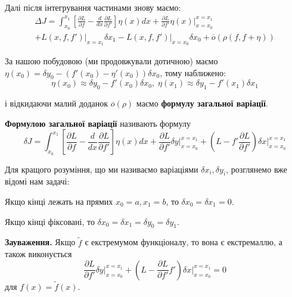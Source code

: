 \documentclass[14pt]{extarticle}
\newcommand{\<}{\langle}
\renewcommand{\>}{\rangle}
\theoremstyle{mystyle}{\newtheorem{definition}{Definition}[section]}
\theoremstyle{mystyle}{\newtheorem{proposition}[definition]{Proposition}}
\theoremstyle{mystyle}{\newtheorem{theorem}[definition]{Theorem}}
\theoremstyle{mystyle}{\newtheorem{lemma}[definition]{Lemma}}
\theoremstyle{mystyle}{\newtheorem{corollary}[definition]{Corollary}}
\theoremstyle{mystyle}{\newtheorem*{remark}{Remark}}
\theoremstyle{mystyle}{\newtheorem*{remarks}{Remarks}}
\theoremstyle{mystyle}{\newtheorem*{example}{Example}}
\theoremstyle{mystyle}{\newtheorem*{examples}{Examples}}
\theoremstyle{definition}{\newtheorem*{exercise}{Exercise}}
\theoremstyle{cstyle}{\newtheorem*{cthm}{}}
\theoremstyle{warn}
\begin{document}
Далі після інтегрування частинами знову маємо:
\begin{gather}
    \Delta J = \int_{x_0}^{x_1}\left[\frac{\partial L}{\partial f}-\frac{d}{dx}\frac{\partial L}{\partial f'}\right]\eta(x)dx + \frac{\partial L}{\partial f'}\eta(x)\Big|_{x=x_0}^{x=x_1} \nonumber \\
 + L(x,f,f')\Big|_{x=x_1}\delta x_1 - L(x,f,f')\Big|_{x=x_0}\delta x_0 + \overline{o}(\rho(f,f+\eta))
\end{gather}

За нашою побудовою (ми продовжували дотичною) маємо $\eta(x_0) = \delta y_0 - (f'(x_0)-\eta'(x_0))\delta x_0$, тому наближено:
\begin{equation}
    \eta(x_0) \approx \delta y_0 - f'(x_0)\delta x_0, \; \eta(x_1) \approx \delta y_1 - f'(x_1)\delta x_1
\end{equation}

і відкидаючи малий доданок $\overline{o}(\rho)$ маємо \textbf{формулу загальної варіації}.
\begin{definition}
\textbf{Формулою загальної варіації} називають формулу
\begin{equation}
    \delta J = \int_{x_0}^{x_1}\left[\frac{\partial L}{\partial f}-\frac{d}{dx}\frac{\partial L}{\partial f'}\right]\eta(x)dx + \frac{\partial L}{\partial f'}\delta y\Big|_{x=x_0}^{x=x_1} +
    \left(L-f'\frac{\partial L}{\partial f'}\right)\delta x \Big|_{x=x_0}^{x=x_1}
\end{equation}
\end{definition}

Для кращого розуміння, що ми називаємо варіаціями $\delta x_i,\delta y_i$,
розглянемо вже відомі нам задачі:

\begin{example}
    Якщо кінці лежать на прямих $x_0=a,x_1=b$, то $\delta x_0=\delta x_1=0$.
\end{example}
\begin{example}
    Якщо кінці фіксовані, то $\delta x_0=\delta x_1 = \delta y_0 = \delta y_1$.
\end{example}

\textbf{Зауваження.} Якщо $\widetilde{f}$ є екстремумом функціоналу, то вона є екстремаллю, а також виконується
\begin{equation}
    \frac{\partial L}{\partial f'}\delta y \Big|_{x=x_0}^{x=x_1} + \left(L-\frac{\partial L}{\partial f'}f'\right)\delta x \Big|_{x=x_0}^{x=x_1} = 0
\end{equation}
для $f(x)=\widetilde{f}(x)$.
\end{document}
